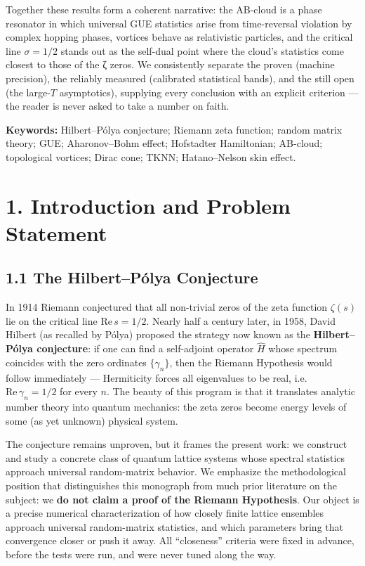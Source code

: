 \documentclass[
]{article}
\begin{document}
Together these results form a coherent narrative: the AB-cloud is a
phase resonator in which universal GUE statistics arise from
time-reversal violation by complex hopping phases, vortices behave as
relativistic particles, and the critical line \(\sigma = 1/2\) stands
out as the self-dual point where the cloud's statistics come closest to
those of the ζ zeros. We consistently separate the proven (machine
precision), the reliably measured (calibrated statistical bands), and
the still open (the large-\(T\) asymptotics), supplying every conclusion
with an explicit criterion --- the reader is never asked to take a
number on faith.

\textbf{Keywords:} Hilbert--Pólya conjecture; Riemann zeta function;
random matrix theory; GUE; Aharonov--Bohm effect; Hofstadter
Hamiltonian; AB-cloud; topological vortices; Dirac cone; TKNN;
Hatano--Nelson skin effect.

\section{1. Introduction and Problem
Statement}\label{introduction-and-problem-statement}

\subsection{1.1 The Hilbert--Pólya
Conjecture}\label{the-hilbertpuxf3lya-conjecture}

In 1914 Riemann conjectured that all non-trivial zeros of the zeta
function \(\zeta(s)\) lie on the critical line \(\mathrm{Re}\,s = 1/2\).
Nearly half a century later, in 1958, David Hilbert (as recalled by
Pólya) proposed the strategy now known as the \textbf{Hilbert--Pólya
conjecture}: if one can find a self-adjoint operator \(\hat H\) whose
spectrum coincides with the zero ordinates \(\{\gamma_n\}\), then the
Riemann Hypothesis would follow immediately --- Hermiticity forces all
eigenvalues to be real, i.e.~\(\mathrm{Re}\,\gamma_n = 1/2\) for every
\(n\). The beauty of this program is that it translates analytic number
theory into quantum mechanics: the zeta zeros become energy levels of
some (as yet unknown) physical system.

The conjecture remains unproven, but it frames the present work: we
construct and study a concrete class of quantum lattice systems whose
spectral statistics approach universal random-matrix behavior. We
emphasize the methodological position that distinguishes this monograph
from much prior literature on the subject: we \textbf{do not claim a
proof of the Riemann Hypothesis}. Our object is a precise numerical
characterization of how closely finite lattice ensembles approach
universal random-matrix statistics, and which parameters bring that
convergence closer or push it away. All ``closeness'' criteria were
fixed in advance, before the tests were run, and were never tuned along
the way.
\end{document}
